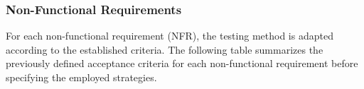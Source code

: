 \subsubsection{Non-Functional Requirements}
\label{sec:non-functional-requirements-validation}

For each non-functional requirement (NFR), the testing method is adapted according to the established criteria. The following table summarizes the previously defined acceptance criteria for each non-functional requirement before specifying the employed strategies.


\vspace{20pt}
    \pagestyle{fancy}
    \small

    \setlength{\tabcolsep}{2pt}
    \setlength{\arrayrulewidth}{0.1pt}
    \renewcommand{\arraystretch}{1.5}
    \setlength{\LTpre}{0pt}
    \setlength{\LTpost}{0pt}

    \setlength{\LTleft}{\fill}
    \setlength{\LTright}{\fill}

